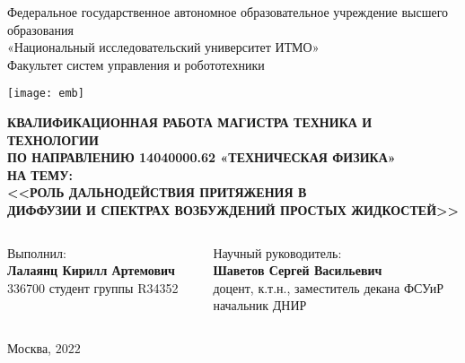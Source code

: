 \documentclass{beamer} %
\begin{document}
\begin{frame}
  \begin{center}\tiny
    Федеральное государственное автономное образовательное учреждение высшего образования \\
    «Национальный исследовательский университет ИТМО»\\
    Факультет систем управления и робототехники
  \end{center}

  \begin{center}
    \texttt{[image: emb]}
  \end{center}

  \begin{center}\tiny
    \textbf{КВАЛИФИКАЦИОННАЯ РАБОТА МАГИСТРА ТЕХНИКА И ТЕХНОЛОГИИ \\ ПО НАПРАВЛЕНИЮ 14040000.62 «ТЕХНИЧЕСКАЯ ФИЗИКА»}\\
    \vspace{0.2cm}
    \textbf{НА ТЕМУ:}\\
    \vspace{0.1cm}
    \textbf{<<РОЛЬ ДАЛЬНОДЕЙСТВИЯ ПРИТЯЖЕНИЯ В \\ ДИФФУЗИИ И СПЕКТРАХ ВОЗБУЖДЕНИЙ ПРОСТЫХ ЖИДКОСТЕЙ>>}
  \end{center}

  \vspace{0.3cm}

  \begin{columns}
    \begin{column}{0.50\textwidth}
      \begin{center}\tiny
        Выполнил: \\
        \vspace{0.1cm}
        \textbf{Лалаянц Кирилл Артемович}\\
        336700
        студент группы R34352 \\
      \end{center}
    \end{column}

    \begin{column}{0.50\textwidth}
      \begin{center}\tiny
        Научный руководитель:\\
        \vspace{0.1cm}
        \textbf{Шаветов Сергей Васильевич} \\
        доцент, к.т.н., заместитель декана ФСУиР\\
        начальник ДНИР \\
      \end{center}
    \end{column}
  \end{columns}

  \vspace{0.5cm}
  \begin{center}\tiny
    Москва, $2022$
  \end{center}
\end{frame}
\end{document}
